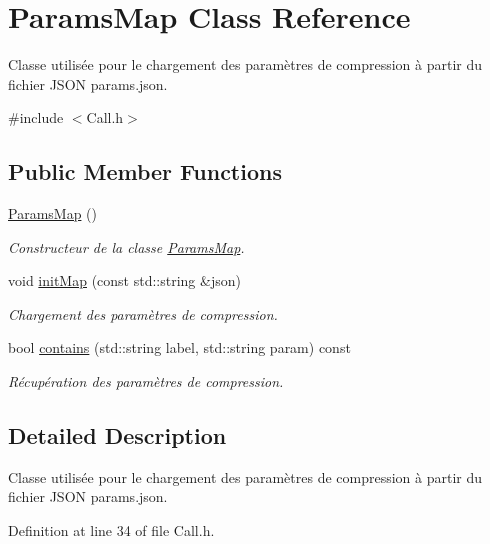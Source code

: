 \hypertarget{class_params_map}{}\section{Params\+Map Class Reference}
\label{class_params_map}


Classe utilisée pour le chargement des paramètres de compression à partir du fichier J\+S\+ON \textquotesingle{}params.\+json\textquotesingle{}.  




{\ttfamily \#include $<$Call.\+h$>$}

\subsection*{Public Member Functions}
\begin{DoxyCompactItemize}
\item 
\hyperlink{class_params_map_a8d606a7d84a804e9480dbbc1806b29df}{Params\+Map} ()
\begin{DoxyCompactList}\small\item\em Constructeur de la classe \hyperlink{class_params_map}{Params\+Map}. \end{DoxyCompactList}\item 
void \hyperlink{class_params_map_a41a00ad45b0153fa04b35ea474e00786}{init\+Map} (const std\+::string \&json)
\begin{DoxyCompactList}\small\item\em Chargement des paramètres de compression. \end{DoxyCompactList}\item 
bool \hyperlink{class_params_map_af25b9a05c7a95b7d8ff1386014b23e41}{contains} (std\+::string label, std\+::string param) const 
\begin{DoxyCompactList}\small\item\em Récupération des paramètres de compression. \end{DoxyCompactList}\end{DoxyCompactItemize}


\subsection{Detailed Description}
Classe utilisée pour le chargement des paramètres de compression à partir du fichier J\+S\+ON \textquotesingle{}params.\+json\textquotesingle{}. 

Definition at line 34 of file Call.\+h.



